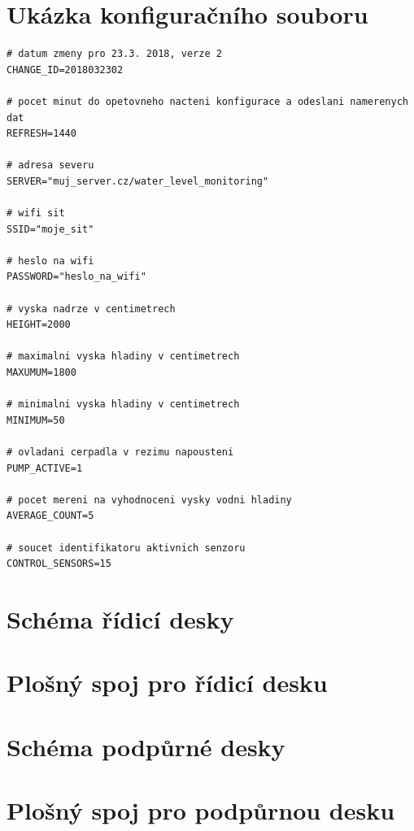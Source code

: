 \chapter{Ukázka konfiguračního souboru}
	\label{sec:cfg}
	\begin{lstlisting}
# datum zmeny pro 23.3. 2018, verze 2
CHANGE_ID=2018032302

# pocet minut do opetovneho nacteni konfigurace a odeslani namerenych dat
REFRESH=1440

# adresa severu
SERVER="muj_server.cz/water_level_monitoring"

# wifi sit 
SSID="moje_sit"

# heslo na wifi
PASSWORD="heslo_na_wifi"

# vyska nadrze v centimetrech
HEIGHT=2000

# maximalni vyska hladiny v centimetrech
MAXUMUM=1800

# minimalni vyska hladiny v centimetrech
MINIMUM=50

# ovladani cerpadla v rezimu napousteni
PUMP_ACTIVE=1

# pocet mereni na vyhodnoceni vysky vodni hladiny
AVERAGE_COUNT=5

# soucet identifikatoru aktivnich senzoru
CONTROL_SENSORS=15\end{lstlisting}

\chapter{Schéma řídicí desky}
	\label{sec:main_board_scheme}
	

\chapter{Plošný spoj pro řídicí desku}
	\label{sec:main_board_pcb}
    

\chapter{Schéma podpůrné desky}
	\label{sec:support_board_scheme}
	

\chapter{Plošný spoj pro podpůrnou desku}
	\label{sec:support_board_pcb}
	
